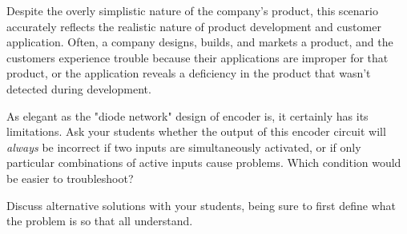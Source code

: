 





Despite the overly simplistic nature of the company's product, this scenario accurately reflects the realistic nature of product development and customer application.  Often, a company designs, builds, and markets a product, and the customers experience trouble because their applications are improper for that product, or the application reveals a deficiency in the product that wasn't detected during development.

As elegant as the "diode network" design of encoder is, it certainly has its limitations.  Ask your students whether the output of this encoder circuit will {\it always} be incorrect if two inputs are simultaneously activated, or if only particular combinations of active inputs cause problems.  Which condition would be easier to troubleshoot?

Discuss alternative solutions with your students, being sure to first define what the problem is so that all understand.




